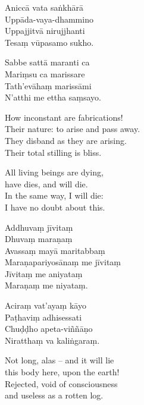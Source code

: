 


Aniccā vata saṅkhārā\\
Uppāda-vaya-dhammino\\
Uppajjitvā nirujjhanti\\
Tesaṃ vūpasamo sukho.

Sabbe sattā maranti ca\\
Mariṃsu ca marissare\\
Tath'evāhaṃ marissāmi\\
N'atthi me ettha saṃsayo.

\begin{english}
  How inconstant are fabrications!\\
  Their nature: to arise and pass away.\\
  They disband as they are arising.\\
  Their total stilling is bliss.

  All living beings are dying,\\
  have dies, and will die.\\
  In the same way, I will die:\\
  I have no doubt about this.
\end{english}



Addhuvaṃ jīvitaṃ\\
Dhuvaṃ maraṇaṃ\\
Avassaṃ mayā maritabbaṃ\\
Maraṇapariyosānaṃ me jīvitaṃ\\
Jīvitaṃ me aniyataṃ\\
Maraṇaṃ me niyataṃ.





Aciraṃ vat'ayaṃ kāyo\\
Paṭhaviṃ adhisessati\\
Chuḍḍho apeta-viññāṇo\\
Niratthaṃ va kaliṅgaraṃ.

\begin{english}
  Not long, alas -- and it will lie\\
  this body here, upon the earth!\\
  Rejected, void of consciousness\\
  and useless as a rotten log.
\end{english}



